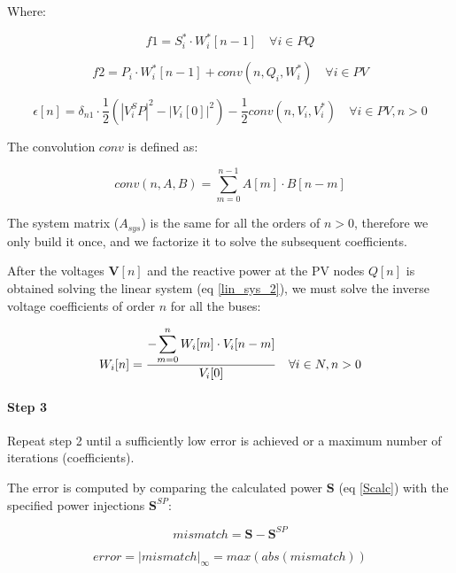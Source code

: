 \documentclass[nols,a4paper,twoside,notoc,fleqn]{tufte-book}
\begin{document}
Where:

\begin{equation}
f1 = S^*_i \cdot W^*_i[n-1] \quad \forall i \in PQ
\end{equation}

\begin{equation}
f2 = P_i \cdot W^*_i[n-1] + conv(n, Q_i, W^*_i) \quad \forall i \in PV
\end{equation}

\begin{equation}
\epsilon[n] = \delta_{n1} \cdot \frac{1}{2} \left(|V_i^SP|^2 - |V_i[0]|^2\right) - \frac{1}{2} conv(n, V_i, V_i^*)  \quad \forall i \in PV, n > 0
\end{equation}

The convolution $conv$ is defined as:

\begin{equation}
conv(n, A, B) = \sum_{m=0}^{n-1} A[m] \cdot B[n-m]
\end{equation}

The system matrix ($A_{sys}$) is the same for all the orders of $n>0$, therefore we only build it once, and we factorize it to solve the subsequent coefficients.

After the voltages $\textbf{V}[n]$ and the reactive power at the PV nodes $Q[n]$ is obtained solving the linear system (eq \ref{lin_sys_2}), we must solve the inverse voltage coefficients of order $n$ for all the buses:

\begin{equation}
W_i[n] = \frac{- \mathlarger{\sum_{m=0}^{n}W_i[m] \cdot V_i[n-m]} }{V_i[0]} \quad  \forall i \in N, n>0
\end{equation}


\paragraph{Step 3}

Repeat step 2 until a sufficiently low error is achieved or a maximum number of iterations (coefficients).


The error is computed by comparing the calculated power $\textbf{S}$ (eq \ref{Scalc}) with the specified power injections $\textbf{S}^{SP}$:

\begin{equation}
mismatch = \textbf{S} - \textbf{S}^{SP}
\end{equation}

\begin{equation}
error = |mismatch|_\infty = max(abs(mismatch))
\end{equation}
\end{document}

